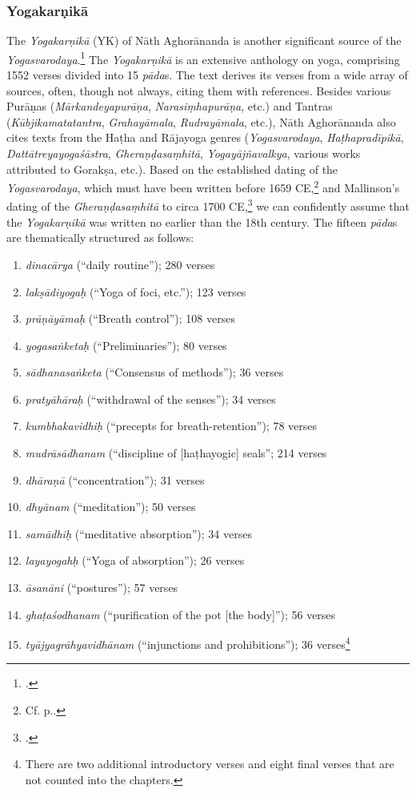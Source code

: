 \subsubsection{Yogakarṇikā}

The \emph{Yogakarṇikā} (YK) of Nāth Aghorānanda is another significant source of the \emph{Yogasvarodaya}.\footnote{\cite{yogakarnika}.} The \emph{Yogakarṇikā} is an extensive anthology on yoga, comprising 1552 verses divided into 15 \textit{pāda}s. The text derives its verses from a wide array of sources, often, though not always, citing them with references. Besides various Purāṇas (\emph{Mārkandeyapurāṇa}, \emph{Narasiṃhapurāṇa}, etc.) and Tantras (\textit{Kūbjikamatatantra}, \textit{Grahayāmala}, \emph{Rudrayāmala}, etc.), Nāth Aghorānanda also cites texts from the Haṭha and Rājayoga genres (\emph{Yogasvarodaya}, \emph{Haṭhapradīpikā}, \emph{Dattātreyayogaśāstra}, \emph{Gheraṇḍasaṃhitā}, \emph{Yogayājñavalkya}, various works attributed to Gorakṣa, etc.). Based on the established dating of the \emph{Yogasvarodaya}, which must have been written before 1659 CE,\footnote{Cf. p.\pageref{dating}.} and Mallinson's dating of the \emph{Gheraṇḍasaṃhitā} to circa 1700 CE,\footnote{\citeauthor[2004: xiv]{MallinsonGheranda}.} we can confidently assume that the \emph{Yogakarṇikā} was written no earlier than the 18th century.
The fifteen \textit{pāda}s are thematically structured as follows:

\begin{enumerate}
\item \textit{dinacārya} (``daily routine''); 280 verses
\item \textit{lakṣādiyogaḥ} (``Yoga of foci, etc.''); 123 verses
\item \textit{prāṇāyāmaḥ} (``Breath control''); 108 verses
\item \textit{yogasaṅketaḥ} (``Preliminaries''); 80 verses
\item \textit{sādhanasaṅketa} (``Consensus of methods''); 36 verses
\item \textit{pratyāhāraḥ} (``withdrawal of the senses''); 34 verses
\item \textit{kumbhakavidhiḥ} (``precepts for breath-retention''); 78 verses
\item \textit{mudrāsādhanam} (``discipline of [haṭhayogic] seals''; 214 verses
\item \textit{dhāraṇā} (``concentration''); 31 verses
\item \textit{dhyānam} (``meditation''); 50 verses
\item \textit{samādhiḥ} (``meditative absorption''); 34 verses
\item \textit{layayogahḥ} (``Yoga of absorption''); 26 verses
\item \textit{āsanāni} (``postures''); 57 verses
\item \textit{ghaṭaśodhanam} (``purification of the pot [the body]''); 56 verses
\item \textit{tyājyagrāhyavidhānam} (``injunctions and prohibitions''); 36 verses\footnote{There are two additional introductory verses and eight final verses that are not counted into the chapters.}
\end{enumerate}

